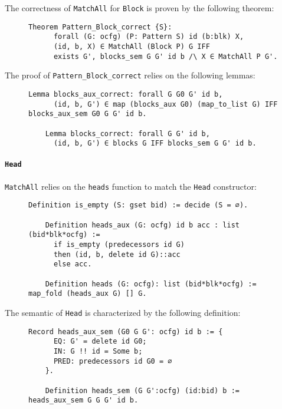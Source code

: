\documentclass[11pt]{article}
\newcommand{\inlinecoq}[1]{\mbox{\lstinline[style=customcoq,columns=fixed,basewidth=.48em]{#1}}}
\newcommand{\ilc}[1]{\inlinecoq{#1}}
\begin{document}
The correctness of \ilc{MatchAll} for \ilc{Block} is proven by the following theorem:

\begin{figure}[H]
  \label{fig:sem_block}
  \begin{lstlisting}[style=customcoq,basicstyle=\small\ttfamily]
    Theorem Pattern_Block_correct {S}:
      forall (G: ocfg) (P: Pattern S) id (b:blk) X,
      (id, b, X) ∈ MatchAll (Block P) G IFF
      exists G', blocks_sem G G' id b /\ X ∈ MatchAll P G'.
  \end{lstlisting}
\end{figure}

The proof of \ilc{Pattern_Block_correct} relies on the following lemmas:

\begin{figure}[H]
  \label{fig:block_cor}
  \begin{lstlisting}[style=customcoq,basicstyle=\small\ttfamily]
    Lemma blocks_aux_correct: forall G G0 G' id b, 
      (id, b, G') ∈ map (blocks_aux G0) (map_to_list G) IFF blocks_aux_sem G0 G G' id b.

    Lemma blocks_correct: forall G G' id b,
      (id, b, G') ∈ blocks G IFF blocks_sem G G' id b.
  \end{lstlisting}
\end{figure}

\paragraph{\ilc{Head}}

\ilc{MatchAll} relies on the \ilc{heads} function to match the \ilc{Head} constructor:

\begin{figure}[H]
  \label{fig:heads_fun}
  \begin{lstlisting}[style=customcoq,basicstyle=\small\ttfamily]
    Definition is_empty (S: gset bid) := decide (S = ∅).

    Definition heads_aux (G: ocfg) id b acc : list (bid*blk*ocfg) :=
      if is_empty (predecessors id G)
      then (id, b, delete id G)::acc
      else acc.

    Definition heads (G: ocfg): list (bid*blk*ocfg) := map_fold (heads_aux G) [] G.
  \end{lstlisting}
\end{figure}

The semantic of \ilc{Head} is characterized by the following definition:

\begin{figure}[H]
  \label{fig:sem_block_def}
  \begin{lstlisting}[style=customcoq,basicstyle=\small\ttfamily]
    Record heads_aux_sem (G0 G G': ocfg) id b := {
      EQ: G' = delete id G0;
      IN: G !! id = Some b;
      PRED: predecessors id G0 = ∅
    }.

    Definition heads_sem (G G':ocfg) (id:bid) b := heads_aux_sem G G G' id b.
  \end{lstlisting}
\end{figure}
\end{document}
